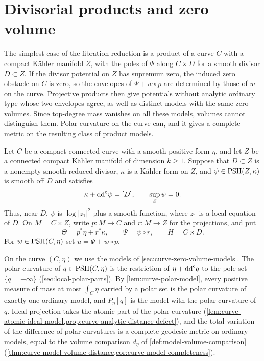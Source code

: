 \section{Divisorial products and zero volume}
\label{subsec:zero-volume-product-obstacles}

The simplest case of the fibration reduction is a product of a curve $C$ with a compact K\"ahler manifold $Z$, with the poles of $\Psi$ along $C\times D$ for a smooth divisor $D\subset Z$. If the divisor potential on $Z$ has supremum zero, the induced zero obstacle on $C$ is zero, so the envelopes of $\Psi+w\circ p$ are determined by those of $w$ on the curve. Projective products then give potentials without analytic ordinary type whose two envelopes agree, as well as distinct models with the same zero volumes. Since top-degree mass vanishes on all these models, volumes cannot distinguish them. Polar curvature on the curve can, and it gives a complete metric on the resulting class of product models.

Let $C$ be a compact connected curve with a smooth positive form $\eta$, and let $Z$ be a connected compact K\"ahler manifold of dimension $k\geq1$. Suppose that $D\subset Z$ is a nonempty smooth reduced divisor, $\kappa$ is a K\"ahler form on $Z$, and $\psi\in\mathrm{PSH}(Z,\kappa)$ is smooth off $D$ and satisfies
\[
 \kappa+\mathrm{dd}^{\mathrm{c}}\psi=[D],\qquad \sup_Z\psi=0.
\]
Thus, near $D$, $\psi$ is $\log|z_1|^2$ plus a smooth function, where $z_1$ is a local equation of $D$. On $M=C\times Z$, write $p\colon M\to C$ and $r\colon M\to Z$ for the projections, and put
\[
 \Theta=p^*\eta+r^*\kappa,\qquad
 \Psi=\psi\circ r,\qquad H=C\times D.
\]
For $w\in\mathrm{PSH}(C,\eta)$ set $u=\Psi+w\circ p$.

On the curve $(C,\eta)$ we use the models of \cref{sec:curve-zero-volume-models}. The polar curvature of $q\in\mathrm{PSH}(C,\eta)$ is the restriction of $\eta+\mathrm{dd}^{\mathrm{c}} q$ to the pole set $\{q=-\infty\}$ (\cref{sec:local-polar-parts}). By \cref{lem:curve-polar-model}, every positive measure of mass at most $\int_C\eta$ carried by a polar set is the polar curvature of exactly one ordinary model, and $P_\eta[q]$ is the model with the polar curvature of $q$. Ideal projection takes the atomic part of the polar curvature (\cref{lem:curve-atomic-ideal-model,prop:curve-analytic-distance-defect}), and the total variation of the difference of polar curvatures is a complete geodesic metric on ordinary models, equal to the volume comparison $d_\eta$ of \cref{def:model-volume-comparison} (\cref{thm:curve-model-volume-distance,cor:curve-model-completeness}).

